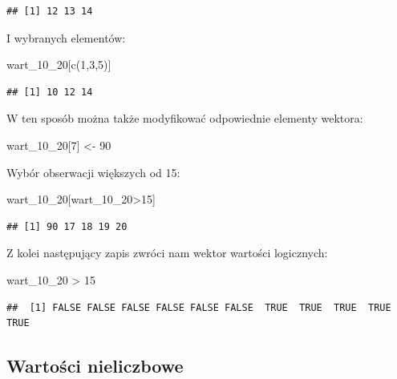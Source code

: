 \documentclass[
]{book}
\newenvironment{Shaded}{\begin{snugshade}}{\end{snugshade}}
\newcommand{\DecValTok}[1]{\textcolor[rgb]{0.00,0.00,0.81}{#1}}
\newcommand{\FunctionTok}[1]{\textcolor[rgb]{0.00,0.00,0.00}{#1}}
\newcommand{\NormalTok}[1]{#1}
\newcommand{\OtherTok}[1]{\textcolor[rgb]{0.56,0.35,0.01}{#1}}
\newcommand{\SpecialCharTok}[1]{\textcolor[rgb]{0.00,0.00,0.00}{#1}}
\begin{document}
\begin{verbatim}
## [1] 12 13 14
\end{verbatim}

I wybranych elementów:

\begin{Shaded}
\begin{Highlighting}[]
\NormalTok{wart\_10\_20[}\FunctionTok{c}\NormalTok{(}\DecValTok{1}\NormalTok{,}\DecValTok{3}\NormalTok{,}\DecValTok{5}\NormalTok{)]}
\end{Highlighting}
\end{Shaded}

\begin{verbatim}
## [1] 10 12 14
\end{verbatim}

W ten sposób można także modyfikować odpowiednie elementy wektora:

\begin{Shaded}
\begin{Highlighting}[]
\NormalTok{wart\_10\_20[}\DecValTok{7}\NormalTok{] }\OtherTok{\textless{}{-}} \DecValTok{90}
\end{Highlighting}
\end{Shaded}

Wybór obserwacji większych od 15:

\begin{Shaded}
\begin{Highlighting}[]
\NormalTok{wart\_10\_20[wart\_10\_20}\SpecialCharTok{\textgreater{}}\DecValTok{15}\NormalTok{]}
\end{Highlighting}
\end{Shaded}

\begin{verbatim}
## [1] 90 17 18 19 20
\end{verbatim}

Z kolei następujący zapis zwróci nam wektor wartości logicznych:

\begin{Shaded}
\begin{Highlighting}[]
\NormalTok{wart\_10\_20 }\SpecialCharTok{\textgreater{}} \DecValTok{15}
\end{Highlighting}
\end{Shaded}

\begin{verbatim}
##  [1] FALSE FALSE FALSE FALSE FALSE FALSE  TRUE  TRUE  TRUE  TRUE  TRUE
\end{verbatim}

\hypertarget{wartoux15bci-nieliczbowe}{%
\subsection{Wartości nieliczbowe}\label{wartoux15bci-nieliczbowe}}
\end{document}
